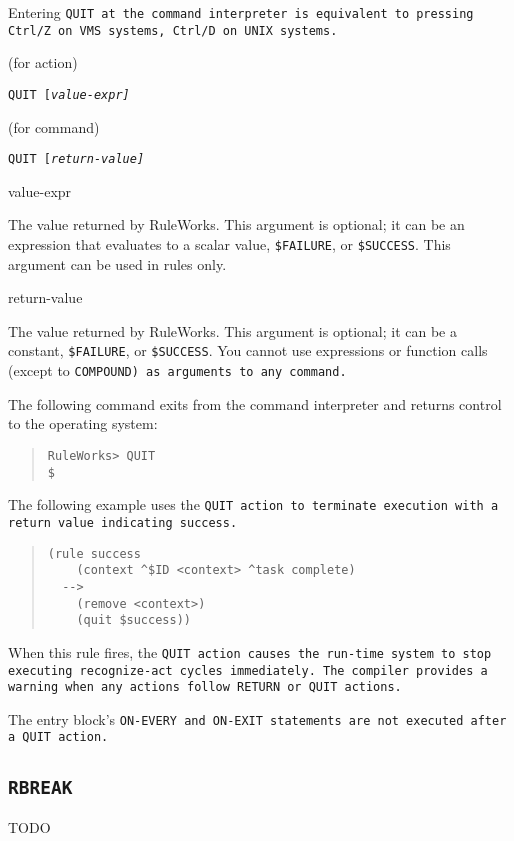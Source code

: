{{Entering \tt{QUIT} at the command interpreter is equivalent to
pressing Ctrl/Z on VMS systems, Ctrl/D on UNIX systems.

\Format (for action)

\tt{QUIT} [\it{value-expr}]

\Format (for command)

\tt{QUIT} [\it{return-value}]

\begin{arguments}
\item[value-expr]

  The value returned by RuleWorks. This argument is optional; it can
  be an expression that evaluates to a scalar value,
  \verb|$FAILURE|, or \verb|$SUCCESS|. This argument can be used in
  rules only.

\item[return-value]

  The value returned by RuleWorks. This argument is optional; it can
  be a constant, \verb|$FAILURE|, or \verb|$SUCCESS|. You cannot use
  expressions or function calls (except to \tt{COMPOUND}) as arguments
  to any command.
\end{arguments}

\Example

The following command exits from the command interpreter and
returns control to the operating system:

\begin{quote}
\begin{verbatim}
RuleWorks> QUIT
$
\end{verbatim}
\end{quote}

The following example uses the \tt{QUIT} action to terminate
execution with a return value indicating success.
\begin{quote}
\begin{verbatim}
(rule success
    (context ^$ID <context> ^task complete)
  -->
    (remove <context>)
    (quit $success))
\end{verbatim}
\end{quote}

When this rule fires, the \tt{QUIT} action causes the run-time system
to stop executing recognize-act cycles immediately.  The compiler
provides a warning when any actions follow \tt{RETURN} or \tt{QUIT}
actions.

The entry block's \tt{ON-EVERY} and \tt{ON-EXIT} statements are not
executed after a \tt{QUIT} action.

\subsection{\tt{RBREAK}}
TODO

}}
